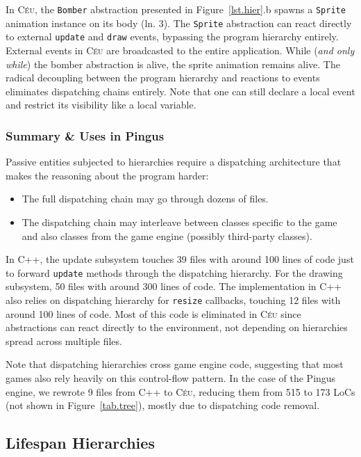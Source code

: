 \documentclass{vgtc}                          %
\newcommand{\CEU}{\textsc{C\'{e}u}\xspace}
\newcommand{\code}[1] {{\small{\texttt{#1}}}}
\begin{document}
In \CEU, the \code{Bomber} abstraction presented in Figure~\ref{lst.hier}.b
spawns a \code{Sprite} animation instance on its body (ln. 3).
%
The \code{Sprite} abstraction can react directly to external \code{update}
and \code{draw} events, bypassing the program hierarchy entirely.
External events in \CEU are broadcasted to the entire application.
While (\emph{and only while}) the bomber abstraction is alive, the sprite
animation remains alive.
The radical decoupling between the program hierarchy and reactions to events
eliminates dispatching chains entirely.
Note that one can still declare a local event and restrict its visibility like
a local variable.

\subsubsection{Summary \& Uses in Pingus}

Passive entities subjected to hierarchies require a dispatching architecture
that makes the reasoning about the program harder:

\begin{itemize}
\item The full dispatching chain may go through dozens of files.
\item The dispatching chain may interleave between classes specific to the game
      and also classes from the game engine (possibly third-party classes).
\end{itemize}

In C++, the update subsystem touches 39 files with around 100 lines of code
just to forward \code{update} methods through the dispatching hierarchy.
For the drawing subsystem, 50 files with around 300 lines of code.
The implementation in C++ also relies on dispatching hierarchy for
\code{resize} callbacks, touching 12 files with around 100 lines of code.
%
Most of this code is eliminated in \CEU since abstractions can react directly
to the environment, not depending on hierarchies spread across multiple files.

Note that dispatching hierarchies cross game engine code, suggesting that most
games also rely heavily on this control-flow pattern.
In the case of the Pingus engine, we rewrote 9 files from C++ to \CEU, reducing
them from 515 to 173 LoCs (not shown in Figure~\ref{tab.tree}), mostly due to
dispatching code removal.

\subsection{Lifespan Hierarchies}
\label{sec.pats.lifespan}
\end{document}
